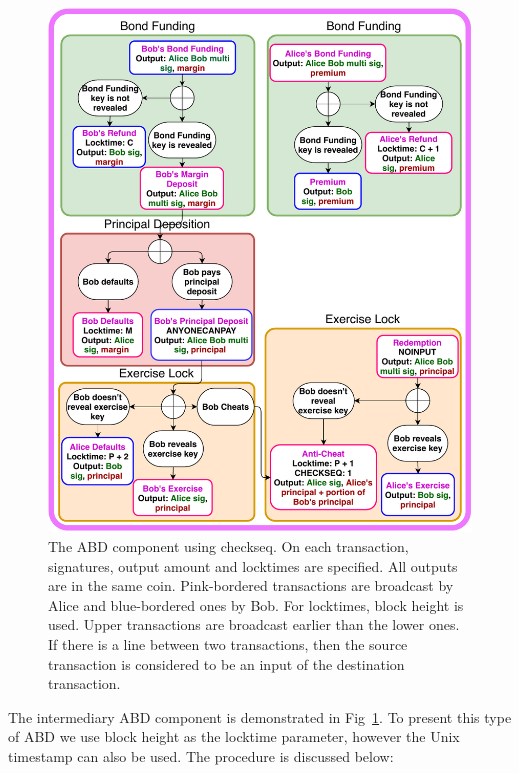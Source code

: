 \begin{figure}[h]
  \centering
  \includegraphics[width=\linewidth]{figures/bond-second.pdf}
  \caption{The ABD component using checkseq. On each transaction, signatures, output amount and locktimes are specified. All outputs are in the same coin. Pink-bordered transactions are broadcast by Alice and blue-bordered ones by Bob. For locktimes, block height is used. Upper transactions are broadcast earlier than the lower ones. If there is a line between two transactions, then the source transaction is considered to be an input of the destination transaction.}
  \label{fig:non-collat-bond}
\end{figure}

The intermediary ABD component is demonstrated in Fig~\ref{fig:non-collat-bond}. To present this type of ABD we use block height as the locktime parameter, however the Unix timestamp can also be used. The procedure is discussed below:

